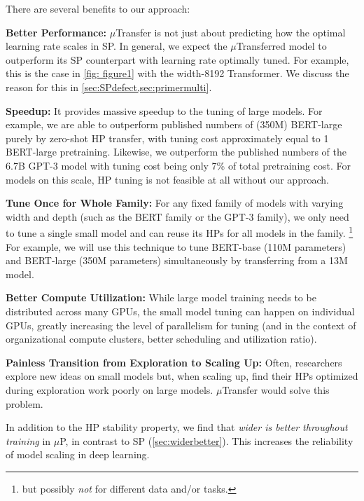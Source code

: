 \documentclass{article}
\theoremstyle{definition}
\begin{document}
There are several benefits to our approach:
\begin{enumerate*}
    \item \textbf{Better Performance:} $\mu$Transfer is not just about predicting how the optimal learning rate scales in SP.
    In general, we expect the $\mu$Transferred model to outperform its SP counterpart with learning rate optimally tuned.
    For example, this is the case in \cref{fig: figure1} with the width-8192 Transformer.
    We discuss the reason for this in \cref{sec:SPdefect,sec:primermulti}.
    \item \textbf{Speedup:} It provides massive speedup to the tuning of large models.
    For example, we are able to outperform published numbers of (350M) BERT-large \citep{devlin_bert_2019}
    purely by zero-shot HP transfer, with tuning cost approximately equal to 1 BERT-large pretraining.
    Likewise, we outperform the published numbers of the 6.7B GPT-3 model \citep{brown2020language} with tuning cost being only 7\% of total pretraining cost.
    For models on this scale, HP tuning is not feasible at all without our approach.
    \item \textbf{Tune Once for Whole Family:} For any fixed family of models with varying width and depth (such as the BERT family or the GPT-3 family), we only need to tune a single small model and can reuse its HPs for all models in the family.
    \footnote{but possibly \emph{not} for different data and/or tasks.}
    For example, we will use this technique to tune BERT-base (110M parameters) and BERT-large (350M parameters) simultaneously by transferring from a 13M model.
    \item \textbf{Better Compute Utilization:} While large model training needs to be distributed across many GPUs, the small model tuning can happen on individual GPUs, greatly increasing the level of parallelism for tuning (and in the context of organizational compute clusters, better scheduling and utilization ratio).
    \item \textbf{Painless Transition from Exploration to Scaling Up:}
    Often, researchers explore new ideas on small models but, when scaling up, find their HPs optimized during exploration work poorly on large models.
    $\mu$Transfer would solve this problem.
\end{enumerate*}

\enlargethispage*{\baselineskip}

In addition to the HP stability property, we find that \emph{wider is better throughout training} in $\mu$P, in contrast to SP (\cref{sec:widerbetter}).
This increases the reliability of model scaling in deep learning.
\end{document}
